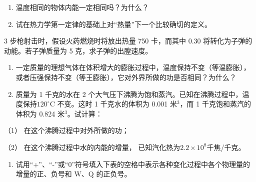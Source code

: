 \begin{enumerate}
\def\labelenumi{\arabic{enumi}.}
\item
  温度相同的物体内能一定相同吗？为什么？
\item
  试在热力学第一定律的基础上对``热量''下一个比较确切的定义。
\end{enumerate}

3 步枪射击时，假设火药燃烧时将放出热量 750 卡，而其中 0.30
将转化为子弹的动能。若子弹质量为 5 克，求子弹的出膛速度。

\begin{enumerate}
\def\labelenumi{\arabic{enumi}.}
\setcounter{enumi}{3}
\item
  一定质量的理想气体在体积增大的膨胀过程中，温度保持不变（等温膨胀），或者压强保持不变（等王膨胀），它对外界所做的功是否相同？为什么？
\item
  质量为 1 千克的水在 2
  个大气压下沸腾为饱和蒸汽。已知在沸腾过程中，温度保持\(120^{\circ}\)C
  不变。这时 1 千克水的体积为 0.001 米\(^{3}\)，而 1
  千克饱和蒸汽的体积为 0.824 米\(^{3}\)。试计算：
\end{enumerate}

（1） 在这个沸腾过程中对外所做的功；

（2） 在这个沸腾过程中水的内能的增量，
已知汽化热为\(2.2 \times 10^{8}\)千焦/千克。

\begin{enumerate}
\def\labelenumi{\arabic{enumi}.}
\setcounter{enumi}{5}
\tightlist
\item
  试用``+''、``-''或``0''符号填入下表的空格中表示各种变化过程中各个物理量的增量的正、负号和
  W、Q 的正负号。
\end{enumerate}

